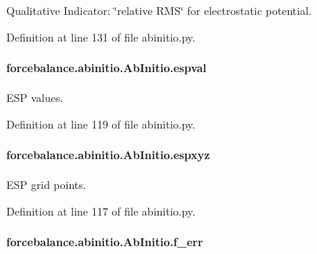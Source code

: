 Qualitative Indicator\-: \char`\"{}relative R\-M\-S\char`\"{} for electrostatic potential. 



Definition at line 131 of file abinitio.\-py.

\hypertarget{classforcebalance_1_1abinitio_1_1AbInitio_aba6d885086d455fce8c3d472fd08020d}{
\paragraph[{espval}]{\setlength{\rightskip}{0pt plus 5cm}forcebalance.\-abinitio.\-Ab\-Initio.\-espval\hspace{0.3cm}{\ttfamily [inherited]}}}\label{classforcebalance_1_1abinitio_1_1AbInitio_aba6d885086d455fce8c3d472fd08020d}


E\-S\-P values. 



Definition at line 119 of file abinitio.\-py.

\hypertarget{classforcebalance_1_1abinitio_1_1AbInitio_a8be2d088afb344036aae989ca3cbcc41}{
\paragraph[{espxyz}]{\setlength{\rightskip}{0pt plus 5cm}forcebalance.\-abinitio.\-Ab\-Initio.\-espxyz\hspace{0.3cm}{\ttfamily [inherited]}}}\label{classforcebalance_1_1abinitio_1_1AbInitio_a8be2d088afb344036aae989ca3cbcc41}


E\-S\-P grid points. 



Definition at line 117 of file abinitio.\-py.

\hypertarget{classforcebalance_1_1abinitio_1_1AbInitio_a176fb2b013ecc5ab451fd3b190414c4d}{
\paragraph[{f\-\_\-err}]{\setlength{\rightskip}{0pt plus 5cm}forcebalance.\-abinitio.\-Ab\-Initio.\-f\-\_\-err\hspace{0.3cm}{\ttfamily [inherited]}}}\label{classforcebalance_1_1abinitio_1_1AbInitio_a176fb2b013ecc5ab451fd3b190414c4d}


